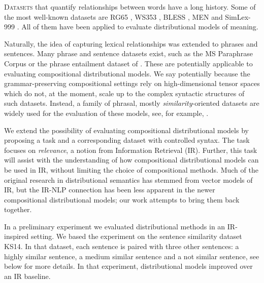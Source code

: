 \lettrine[lines=5,loversize=0.25]{D}{atasets} that quantify relationships between words have a long history.\footnotemark{} Some of the most well-known datasets are RG65 \cite{Rubenstein:1965:CCS:365628.365657}, WS353 \cite{2002:PSC:503104.503110}, BLESS \cite{baroni-lenci:2011:GEMS}, MEN \cite{Bruni:2014:MDS:2655713.2655714} and SimLex-999 \cite{hill2014simlex}. All of them have been applied to evaluate distributional models of meaning.


Naturally, the idea of capturing lexical relationships was extended to phrases and sentences. Many phrase and sentence datasets exist, such as the MS Paraphrase Corpus \cite{dolan2005par} or the phrase entailment dataset of . These are potentially applicable to evaluating compositional distributional models. We say potentially because the grammar-preserving compositional settings \cite{baroni2014frege,DBLP:journals/corr/abs-1003-4394}  rely on high-dimensional tensor spaces which do not, at the moment, scale up to  the complex syntactic structures of such datasets. Instead, a family of phrasal, mostly \emph{similarity}-oriented datasets \cite{mitchell-lapata:2008:ACLMain,Grefenstette:2011:ESC:2145432.2145580,kartsaklis-sadrzadeh:2013:EMNLP,kartsadrqpl2014} are widely used for the evaluation of these models, see, for example, \citet{kim-demarneffe-foslerlussier:2015:VSM-NLP}.

We extend the possibility of evaluating compositional distributional models by proposing a task and a corresponding dataset  with controlled syntax. The task focuses on \emph{relevance}, a notion from Information Retrieval (IR).  Further, this task will assist with the understanding of how compositional distributional  models  can be used in IR, without limiting the choice of compositional methods. Much of the original research in distributional semantics has stemmed from vector models of IR, but the IR-NLP connection has been less apparent in  the newer compositional distributional models; our work attempts to bring them back together.

In a preliminary experiment \cite{Milajevs:2015:IMN:2808194.2809448} we evaluated distributional methods in an IR-inspired setting. We based the experiment on the sentence similarity dataset KS14. In that dataset, each sentence is paired with three other sentences: a highly similar sentence, a medium similar sentence and a not similar sentence, see below for more details. In that experiment, distributional models improved over an IR baseline.

